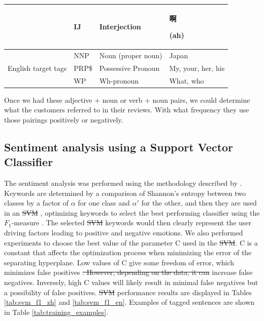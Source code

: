 \documentclass[smallextended,natbib]{svjour3}       %
\providecommand{\DIFadd}[1]{{\protect\color{blue}\uwave{#1}}} %
\providecommand{\DIFdel}[1]{{\protect\color{red}\sout{#1}}}                      %
\providecommand{\DIFaddbegin}{} %
\providecommand{\DIFaddend}{} %
\providecommand{\DIFdelbegin}{} %
\providecommand{\DIFdelend}{} %
\newcommand{\DIFscaledelfig}{0.5}
\newlength{\DIFdelgraphicswidth} %
\newlength{\DIFdelgraphicsheight} %
\newcommand{\DIFaddincludegraphics}[2][]{{\color{blue}\fbox{\DIFOincludegraphics[#1]{#2}}}} %
\newcommand{\DIFdelincludegraphics}[2][]{%
\sbox{\DIFdelgraphicsbox}{\DIFOincludegraphics[#1]{#2}}%
\settoboxwidth{\DIFdelgraphicswidth}{\DIFdelgraphicsbox} %
\settoboxtotalheight{\DIFdelgraphicsheight}{\DIFdelgraphicsbox} %
\scalebox{\DIFscaledelfig}{%
\parbox[b]{\DIFdelgraphicswidth}{\usebox{\DIFdelgraphicsbox}\\[-\baselineskip] \rule{\DIFdelgraphicswidth}{0em}}\llap{\resizebox{\DIFdelgraphicswidth}{\DIFdelgraphicsheight}{%
\setlength{\unitlength}{\DIFdelgraphicswidth}%
\begin{picture}(1,1)%
\thicklines\linethickness{2pt} %
{\color[rgb]{1,0,0}\put(0,0){\framebox(1,1){}}}%
{\color[rgb]{1,0,0}\put(0,0){\line( 1,1){1}}}%
{\color[rgb]{1,0,0}\put(0,1){\line(1,-1){1}}}%
\end{picture}%
}\hspace*{3pt}}} %
} %
\DeclareRobustCommand{\DIFaddbegin}{\DIFOaddbegin \let\includegraphics\DIFaddincludegraphics} %
\DeclareRobustCommand{\DIFaddend}{\DIFOaddend \let\includegraphics\DIFOincludegraphics} %
\DeclareRobustCommand{\DIFdelbegin}{\DIFOdelbegin \let\includegraphics\DIFdelincludegraphics} %
\DeclareRobustCommand{\DIFdelend}{\DIFOaddend \let\includegraphics\DIFOincludegraphics} %
\begin{document}
\begin{table}[ht]
{\begin{tabular}{|c|l|l|l|}
                                                & IJ    & Interjection       & \begin{CJK}{UTF8}{gbsn}啊\end{CJK} (ah)     \\ \hline
        \multirow{3}{*}{English target tags}    & NNP   & Noun (proper noun) & Japan                                      \\ \cline{2-4} 
                                                & PRP\$ & Possessive Pronoun & My, your, her, his                         \\ \cline{2-4} 
                                                & WP    & Wh-pronoun         & What, who                                  \\ \hline
        \end{tabular}%
        }
    \end{table}

    Once we had these adjective + noun or verb + noun pairs, we could determine what the customers referred to in their reviews. With what frequency they use those pairings positively or negatively.

  \subsection{Sentiment analysis using a Support Vector Classifier}\label{sentimentanalysis}

    The sentiment analysis was performed using the methodology described by \cite{Aleman2018ICAROB}. Keywords are determined by a comparison of Shannon's entropy \cite[][]{shannon1948} between two classes by a factor of \(\alpha\) for one class and \(\alpha'\) for the other, and then they are used in an \DIFdelbegin \DIFdel{SVM }\DIFdelend \DIFaddbegin \DIFadd{SVC }\DIFaddend \cite[][]{cortes1995}, optimizing keywords to select the best performing classifier using the \(F_1\)-measure \cite[][]{powers2011}. The selected \DIFdelbegin \DIFdel{SVM }\DIFdelend \DIFaddbegin \DIFadd{SVC }\DIFaddend keywords would then clearly represent the user driving factors leading to positive and negative emotions. We also performed experiments to choose the best value of the parameter C used in the \DIFdelbegin \DIFdel{SVM}\DIFdelend \DIFaddbegin \DIFadd{SVC}\DIFaddend . C is a constant that affects the optimization process when minimizing the error of the separating hyperplane. Low values of C give some freedom of error, which minimizes false positives \DIFdelbegin \DIFdel{. However, depending on the data, it can }\DIFdelend \DIFaddbegin \DIFadd{but can also }\DIFaddend increase false negatives. Inversely, high C values will likely result in minimal false negatives but a possibility of false positives. \DIFdelbegin \DIFdel{SVM }\DIFdelend \DIFaddbegin \DIFadd{SVC }\DIFaddend performance results are displayed in  Tables \ref{tab:svm_f1_zh} and \ref{tab:svm_f1_en}. Examples of tagged sentences are shown in Table \ref{tab:training_examples}. 
\end{document}
